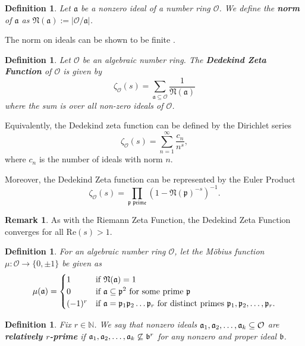 \documentclass[12pt]{amsart}
\newtheorem{definition}[theorem]{Definition}
\theoremstyle{definition}
\newtheorem*{remark}{Remark}
\newcommand{\f}[1]{\mathfrak{#1}}
\begin{document}
\begin{definition} \label{ideal-norm}
	Let $\mathfrak{a}$ be a nonzero ideal of a number ring $\mathcal{O}$. We
	define the \textbf{norm} of \(\f{a}\) as \(\f{N(a)}:=|\mathcal{O}/\f{a}|\).
\end{definition}

The norm on ideals can be shown to be finite \cite{Marcus}. 

\begin{definition} Let \(\mathcal{O}\) be an algebraic number ring. The \textbf{Dedekind Zeta Function} of \(\mathcal{O}\) is given by \begin{equation}
		\zeta_\mathcal{O}(s)=\sum_{\f{a\subseteq \mathcal{O}}}\frac{1}{\f{N(a)}}
	\end{equation} where the sum is over all non-zero ideals of \(\mathcal{O}\).
\end{definition}

Equivalently, the Dedekind zeta function can be defined by the Dirichlet series
$$\zeta_\mathcal{O}(s)=\sum_{n=1}^{\infty}\frac{c_n}{n^s},$$
where \(c_n\) is the number of ideals with norm \(n\).

Moreover, the Dedekind Zeta function can be represented by the Euler Product
$$\zeta_{\mathcal{O}}(s)=\prod_{\f{p \text{ prime}}}(1-\f{N(p)}^{-s})^{-1}.$$

\begin{remark}
	As with the Riemann Zeta Function, the Dedekind Zeta Function converges for all \(\text{Re} (s)>1\).
\end{remark}

\begin{definition} For an algebraic number ring $\mathcal{O}$, let the M\"obius function $\mu:\mathcal{O}\to \{0,\pm 1\}$ be given as
	\begin{equation*}
		\mu(\f{a})=\begin{cases}
			1 & \text{if \(\f{\mathfrak{N}(a)}=1\)}\\
			0 & \text{if \(\f{a\subseteq \f{p}}^2\) for some prime \(\f{p}\) }\\
			(-1)^r & \text{if \(\f{a}=\f{p}_1 \f{p}_2\mathellipsis\f{p}_r\) for distinct primes \( \f{p}_1,\f{p}_2,\mathellipsis, \f{p}_r\)}.
		\end{cases}
	\end{equation*}
\end{definition}

\begin{definition} Fix $r \in \mathbb{N}$. We say that nonzero ideals \(\f{a}_1,\f{a}_2,\mathellipsis,\f{a}_k \subseteq \mathcal{O}\)  are \textbf{relatively \(r\)-prime} if \(\f{a}_1,\f{a}_2,\mathellipsis,\f{a}_k\not\subseteq \f{b}^r\) for any nonzero and proper ideal \(\f{b}\).
\end{definition}
\end{document}
